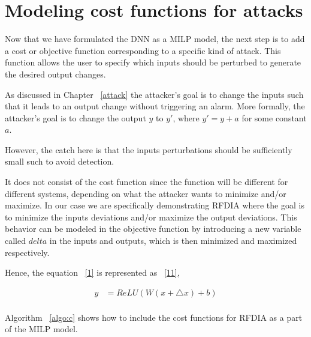 \section{Modeling cost functions for attacks}
\label{section:costfunction}
Now that we have formulated the DNN as a MILP model, the next step is to add a cost or objective function corresponding to a specific kind of attack. 
This function allows the user to specify which inputs should be perturbed to generate the desired output changes.

As discussed in Chapter ~\ref{attack} the attacker's goal is to change the inputs such that it leads to an output change without triggering an alarm.
More formally, the attacker's goal is to change the output $y$ to $y'$, where $y' = y + a$ for some constant $a$. 

 



However, the catch here is that the inputs perturbations should be sufficiently small such to avoid detection.  


It does not consist of the cost function since the function will be different for different systems, depending on what the attacker wants to minimize and/or maximize.
In our case we are specifically demonstrating \ac{RFDIA} where the goal is to minimize the inputs deviations and/or maximize the output deviations.  
This behavior can be modeled in the objective function by introducing a new variable called $delta$ in the inputs and outputs, which is then minimized and maximized  respectively. 

Hence, the equation ~\ref{1} is represented as ~\ref{11},

\begin{align}
\label{11}
y &=  ReLU(W(x + \bigtriangleup  x ) + b)\\
\end{align}

Algorithm ~\ref{algo:c} shows how to include the cost functions for \ac{RFDIA} as a part of the MILP model. 
 
